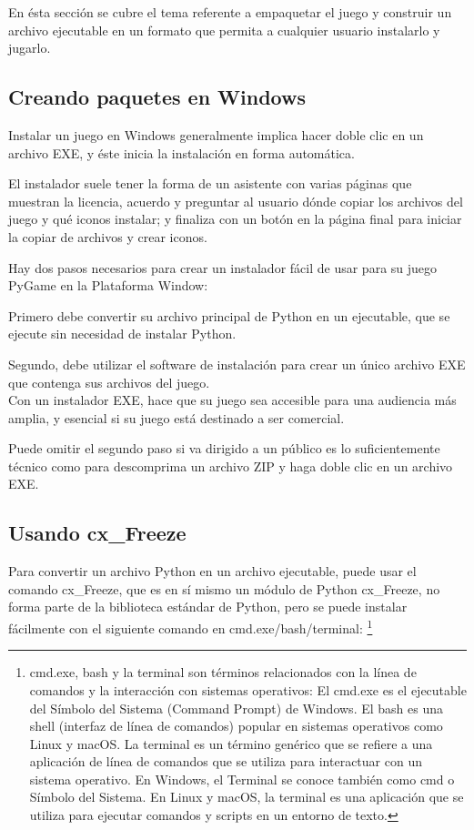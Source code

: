En ésta sección se cubre el tema referente a empaquetar el juego y construir un archivo ejecutable en un formato que permita a  cualquier usuario instalarlo y jugarlo.

\subsection{Creando paquetes en Windows}         

Instalar un juego en Windows generalmente implica hacer doble clic en un archivo {\ttfamily EXE}, 
y éste inicia la instalación en forma automática. 

El instalador suele tener la forma de un asistente con varias páginas que muestran la licencia, acuerdo y preguntar al usuario
dónde copiar los archivos del juego y qué iconos instalar; y finaliza con un botón en la página final para iniciar la copiar de archivos y crear iconos.

Hay dos pasos necesarios para crear un instalador fácil de usar para su juego PyGame en la Plataforma Window:

Primero debe convertir su archivo principal de Python en un ejecutable, que se ejecute sin necesidad de instalar Python.

Segundo, debe utilizar el software de instalación para crear un único archivo {\ttfamily EXE} que contenga sus archivos del juego.\\


Con un instalador EXE, hace que su juego sea accesible para una audiencia más amplia, y  esencial si su juego
está destinado a ser comercial. 

Puede omitir el segundo paso si  va dirigido a un público es lo suficientemente técnico como para
descomprima un archivo {\ttfamily ZIP} y haga doble clic en un archivo {\ttfamily EXE}.


\subsection{Usando cx\_Freeze}

Para convertir un archivo Python en un archivo ejecutable, puede usar el comando {\ttfamily cx\_Freeze}, 
que es en sí mismo un módulo de Python {\ttfamily cx\_Freeze}, no forma parte de la biblioteca estándar de Python, pero se puede 
instalar fácilmente con el siguiente comando en cmd.exe/bash/terminal:  \footnote{cmd.exe, bash y la terminal son términos relacionados con la línea de comandos y la interacción con sistemas operativos:	
	El cmd.exe es el ejecutable del Símbolo del Sistema (Command Prompt) de Windows. 	
	El bash es una shell (interfaz de línea de comandos) popular en sistemas operativos como Linux y macOS.	
	La terminal es un término genérico que se refiere a una aplicación de línea de comandos que se utiliza para interactuar con un sistema operativo. En Windows, el Terminal se conoce también como cmd o Símbolo del Sistema. En Linux y macOS, la terminal es una aplicación que se utiliza para ejecutar comandos y scripts en un entorno de texto.}\\
	
